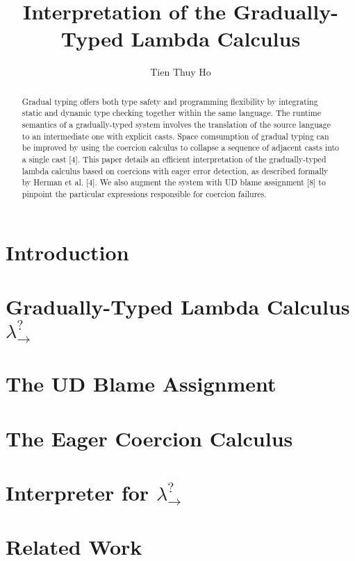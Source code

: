 \documentclass[11pt]{article}
\title{\bf Interpretation of the Gradually-Typed Lambda Calculus}
\author{Tien Thuy Ho}
\begin{document}




\setcounter{page}{3}
\tableofcontents
\listoffigures

\maketitle
{}

\begin{abstract}
Gradual typing offers both type safety and programming flexibility by integrating static and dynamic type checking 
together within the same language. The runtime semantics of a gradually-typed system involves the translation of the 
source language to an intermediate one with explicit casts. Space comsumption of gradual typing can be improved by using 
the coercion calculus to collapse a sequence of adjacent casts into a single cast [4]. This paper details an efficient 
interpretation of the gradually-typed lambda calculus based on coercions with eager error detection, as described formally 
by Herman et al. [4]. We also augment the system with UD blame assignment [8] to pinpoint the particular expressions 
responsible for coercion failures.
\end{abstract}

\section{Introduction} 
\section{Gradually-Typed Lambda Calculus $\lambda ^? _{\rightarrow}$} 
\section{The UD Blame Assignment} 
\section{The Eager Coercion Calculus} 
\section{Interpreter for $\lambda ^? _{\rightarrow}$} 
\section{Related Work} 
\end{document}
